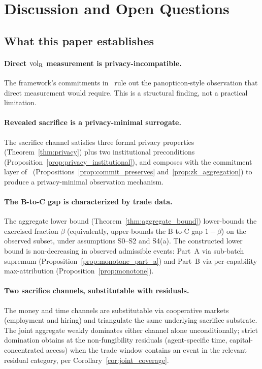 \section{Discussion and Open Questions}
\label{sec:discussion}

\subsection{What this paper establishes}

\paragraph{Direct ${\operatorname{vol}_{\mathrm{R}}}$ measurement is privacy-incompatible.}
The framework's commitments
in~\citep{lasser2026exo,lasser2026phase,lasser2026wamura} rule out
the panopticon-style observation that direct measurement would
require.  This is a structural finding, not a practical limitation.

\paragraph{Revealed sacrifice is a privacy-minimal surrogate.}
The sacrifice channel satisfies three formal privacy properties
(Theorem~\ref{thm:privacy}) plus two institutional preconditions
(Proposition~\ref{prop:privacy_institutional}), and composes with
the commitment layer
of~\citep{lasser2026exo}
(Propositions~\ref{prop:commit_preserves}
and~\ref{prop:zk_aggregation}) to produce a privacy-minimal
observation mechanism.

\paragraph{The B-to-C gap is characterized by trade data.}
The aggregate lower bound
(Theorem~\ref{thm:aggregate_bound}) lower-bounds the exercised
fraction $\beta$ (equivalently, upper-bounds the B-to-C gap
$1 - \beta$) on the observed subset, under assumptions S0--S2
and S4(a).  The constructed lower bound is non-decreasing in
observed admissible events: Part~A via sub-batch supremum
(Proposition~\ref{prop:monotone_part_a}) and Part~B via
per-capability max-attribution
(Proposition~\ref{prop:monotone}).

\paragraph{Two sacrifice channels, substitutable with residuals.}
The money and time channels are substitutable via cooperative
markets (employment and hiring) and triangulate the same
underlying sacrifice substrate.  The joint aggregate weakly
dominates either channel alone unconditionally; strict
domination obtains at the non-fungibility residuals
(agent-specific time, capital-concentrated access) when the
trade window contains an event in the relevant residual
category, per Corollary~\ref{cor:joint_coverage}.

